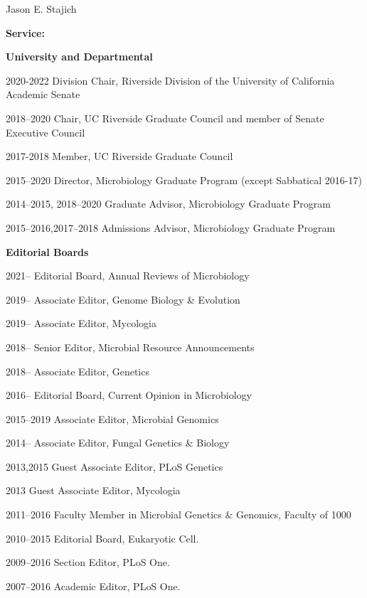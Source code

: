 \documentclass[10pt]{article}
\begin{document}
\begin{cv}{\centerline{Jason E. Stajich}}
\begin{cvlistcompact}{\bf Service:}
\item[{\bf University and Departmental}]
\item [2020-2022] Division Chair, Riverside Division of the University of California Academic Senate
\item [2018--2020] Chair, UC Riverside Graduate Council and member of Senate Executive Council
\item [2017-2018] Member, UC Riverside Graduate Council
\item [2015--2020] Director, Microbiology Graduate Program (except Sabbatical 2016-17)
\item [2014--2015, 2018--2020] Graduate Advisor, Microbiology Graduate Program
\item [2015--2016,2017--2018] Admissions Advisor, Microbiology Graduate Program
\\

\item[{\bf Editorial Boards}]
\item [2021--] Editorial Board, Annual Reviews of Microbiology
\item [2019--] Associate Editor, Genome Biology \& Evolution
\item [2019--] Associate Editor, Mycologia
\item [2018--] Senior Editor, Microbial Resource Announcements
\item [2018--] Associate Editor, Genetics
\item [2016--] Editorial Board, Current Opinion in Microbiology
\item [2015--2019] Associate Editor, Microbial Genomics
\item [2014--] Associate Editor, Fungal Genetics \& Biology
\item [2013,2015] Guest Associate Editor, PLoS Genetics
\item [2013] Guest Associate Editor, Mycologia
\item [2011--2016] Faculty Member in Microbial Genetics \& Genomics,
  Faculty of 1000
\item [2010--2015] Editorial Board, Eukaryotic Cell.
\item [2009--2016] Section Editor, PLoS One.
\item [2007--2016] Academic Editor, PLoS One.
\\


\end{cvlistcompact}
\end{cv}
\end{document}
